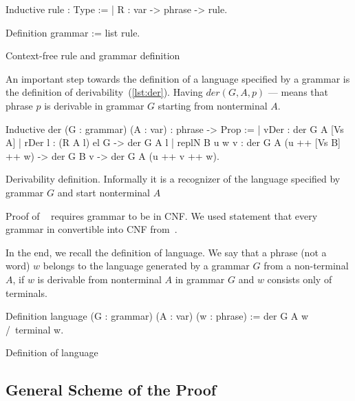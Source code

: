 \begin{listing}[h]
    \begin{pyglist}[language=coq, numbers=none, numbersep=5pt]
  Inductive rule : Type :=
  | R : var -> phrase -> rule.
        
  Definition grammar := list rule.
    \end{pyglist}
    \caption{Context-free rule and grammar definition}
    \label{lst:grm}
\end{listing}

An important step towards the definition of a language specified by a grammar is the definition of derivability~(\ref{lst:der}). Having $der(G, A, p)$ --- means that phrase $p$ is derivable in grammar $G$ starting from nonterminal $A$.

\begin{listing}[h]
    \begin{pyglist}[language=coq, numbers=none, numbersep=5pt]
  Inductive der (G : grammar) 
                (A : var) : phrase -> Prop :=
  | vDer : der G A [Vs A]
  | rDer l : (R A l) el G -> der G A l
  | replN B u w v : 
      der G A (u ++ [Vs B] ++ w) -> 
      der G B v -> der G A (u ++ v ++ w).
    \end{pyglist}
    \caption{Derivability definition. Informally it is a recognizer of the language specified by grammar $G$ and start nonterminal $A$}
    \label{lst:der}
\end{listing}

Proof of ~\cite{beigelproof}  requires grammar to be in CNF. We used statement that every grammar in convertible into CNF from~\cite{smolkaHofmann2016}.

In the end, we recall the definition of language. We say that a phrase (not a word) $ w $ belongs to the language generated by a grammar $G$ from a non-terminal $A$, if $ w $ is derivable from nonterminal $ A $ in grammar $ G $ and $ w $ consists only of terminals.

\begin{listing}[h]
	\begin{pyglist}[language=coq, numbers=none, numbersep=5pt]
  Definition language 
            (G : grammar) (A : var) (w : phrase) :=
    der G A w /\ terminal w.
	\end{pyglist}
	\caption{Definition of language}
	\label{lst:lang}
\end{listing}



\subsection{General Scheme of the Proof}

